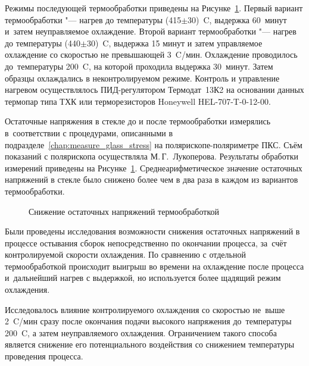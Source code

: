 Режимы последующей термообработки приведены на Рисунке~\ref{fig:annealing_results}.
Первый вариант термообработки "--- нагрев до температуры
(415\(\pm\)30)~{\textdegree}C, выдержка 60~минут и~затем неуправляемое охлаждение.
Второй вариант термообработки "--- нагрев до температуры
(440\(\pm\)30)~{\textdegree}C, выдержка 15 минут и затем управляемое охлаждение со
скоростью не превышающей 3~{\textdegree}C/мин. Охлаждение проводилось
до~температуры 200~{\textdegree}C, на которой проходила выдержка 30~минут. Затем
образцы охлаждались в неконтролируемом режиме.
Контроль и управление нагревом осуществлялось ПИД\nb-регулятором Термодат~13К2
на основании данных термопар типа ТХК или терморезисторов Honeywell
\mbox{HEL-707-T-0-12-00}.

Остаточные напряжения в стекле до и после термообработки измерялись
в~соответствии с процедурами, описанными в
подразделе~\ref{chap:measure_glass_stress} на полярископе\nb-поляриметре
ПКС. Съём показаний с полярископа осуществляла
М.\,Г.~Лукоперова.
Результаты обработки измерений приведены на Рисунке~\ref{fig:annealing_results}.
Среднеарифметическое значение остаточных напряжений в стекле было снижено более
чем в два раза в каждом из вариантов термообработки.

\begin{figure}[!htb]
    \centering%
    \noindent%
    \par%
    \noindent%
    \par%

    \caption{Снижение остаточных напряжений термообработкой}
    \label{fig:annealing_results}
\end{figure}

Были проведены исследования возможности снижения остаточных напряжений в
процессе остывания сборок непосредственно по окончании процесса, за~счёт
контролируемой скорости охлаждения. По сравнению с отдельной термообработкой
происходит выигрыш во времени на охлаждение после процесса и~дальнейший нагрев с
выдержкой, но используется более щадящий режим охлаждения.

Исследовалось влияние контролируемого охлаждения со скоростью не~выше
2~{\textdegree}C/мин сразу после окончания подачи высокого напряжения
до~температуры 200~{\textdegree}C, а затем неуправляемого охлаждения. Ограничением
такого способа является снижение его потенциального воздействия со снижением
температуры проведения процесса.

